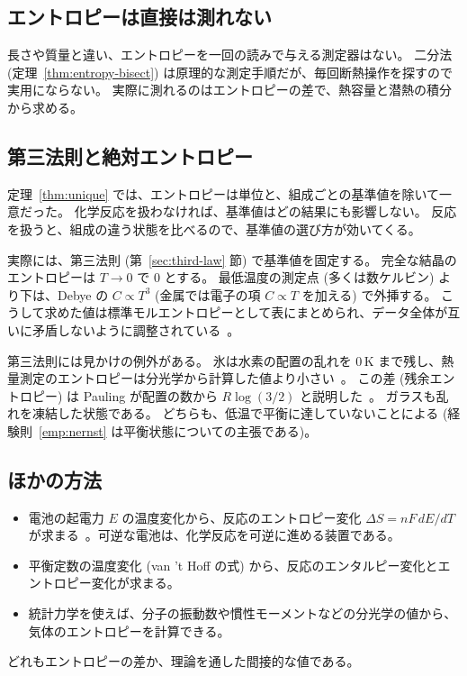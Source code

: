 \subsection{エントロピーは直接は測れない}

長さや質量と違い、エントロピーを一回の読みで与える測定器はない。
二分法 (定理~\ref{thm:entropy-bisect}) は原理的な測定手順だが、毎回断熱操作を探すので実用にならない。
実際に測れるのはエントロピーの差で、熱容量と潜熱の積分から求める。

\subsection{第三法則と絶対エントロピー}

定理~\ref{thm:unique} では、エントロピーは単位と、組成ごとの基準値を除いて一意だった。
化学反応を扱わなければ、基準値はどの結果にも影響しない。
反応を扱うと、組成の違う状態を比べるので、基準値の選び方が効いてくる。

実際には、第三法則 (第~\ref{sec:third-law} 節) で基準値を固定する。
完全な結晶のエントロピーは $T \to 0$ で $0$ とする。
最低温度の測定点 (多くは数ケルビン) より下は、Debye の $C \propto T^3$ (金属では電子の項 $C \propto T$ を加える) で外挿する。
こうして求めた値は標準モルエントロピーとして表にまとめられ、データ全体が互いに矛盾しないように調整されている~\cite{CODATA1989}。

第三法則には見かけの例外がある。
氷は水素の配置の乱れを $0\,\mathrm{K}$ まで残し、熱量測定のエントロピーは分光学から計算した値より小さい~\cite{GiauqueStout1936}。
この差 (残余エントロピー) は Pauling が配置の数から $R \log(3/2)$ と説明した~\cite{Pauling1935}。
ガラスも乱れを凍結した状態である。
どちらも、低温で平衡に達していないことによる (経験則~\ref{emp:nernst} は平衡状態についての主張である)。

\subsection{ほかの方法}

\begin{itemize}
  \item 電池の起電力 $E$ の温度変化から、反応のエントロピー変化 $\Delta S = nF\, dE/dT$ が求まる~\cite{Gerke1922}。可逆な電池は、化学反応を可逆に進める装置である。
  \item 平衡定数の温度変化 (van 't Hoff の式) から、反応のエンタルピー変化とエントロピー変化が求まる。
  \item 統計力学を使えば、分子の振動数や慣性モーメントなどの分光学の値から、気体のエントロピーを計算できる。
\end{itemize}
どれもエントロピーの差か、理論を通した間接的な値である。

